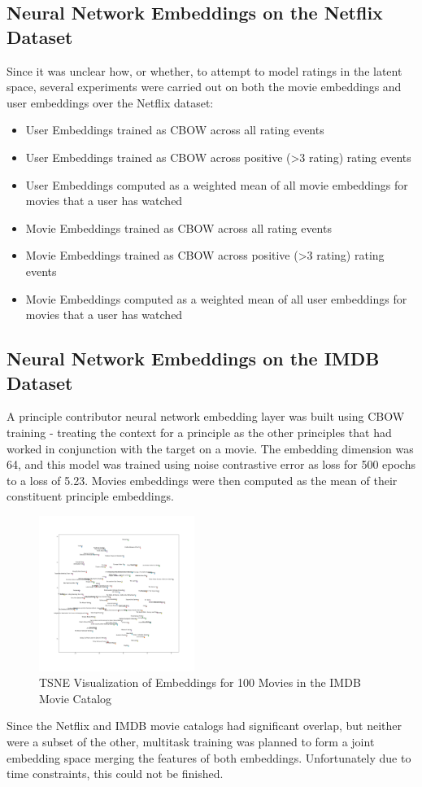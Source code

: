 \subsection{Neural Network Embeddings on the Netflix Dataset}
Since it was unclear how, or whether, to attempt to model ratings in the latent space, several experiments were carried out on both the movie embeddings and user embeddings over the Netflix dataset:
\begin{itemize}
\item User Embeddings trained as CBOW across all rating events
\item User Embeddings trained as CBOW across positive (>3 rating) rating events
\item User Embeddings computed as a weighted mean of all movie embeddings for movies that a user has watched
\item Movie Embeddings trained as CBOW across all rating events
\item Movie Embeddings trained as CBOW across positive (>3 rating) rating events
\item Movie Embeddings computed as a weighted mean of all user embeddings for movies that a user has watched
\end{itemize}

\subsection{Neural Network Embeddings on the IMDB Dataset}
A principle contributor neural network embedding layer was built using CBOW training - treating the context for a principle as the other principles that had worked in conjunction with the target on a movie. The embedding dimension was 64, and this model was trained using noise contrastive error as loss for 500 epochs to a loss of 5.23. Movies embeddings were then computed as the mean of their constituent principle embeddings. 
\begin{figure}[h]
    \centering
    \includegraphics[width=0.45\textwidth]{images/imdb_movie_embeddings_100.png}
    \caption{TSNE Visualization of Embeddings for 100 Movies in the IMDB Movie Catalog}
    \label{fig:TSNE IMDB Movie Embeddings}
\end{figure}
Since the Netflix and IMDB movie catalogs had significant overlap, but neither were a subset of the other, multitask training was planned to form a joint embedding space merging the features of both embeddings. Unfortunately due to time constraints, this could not be finished.
